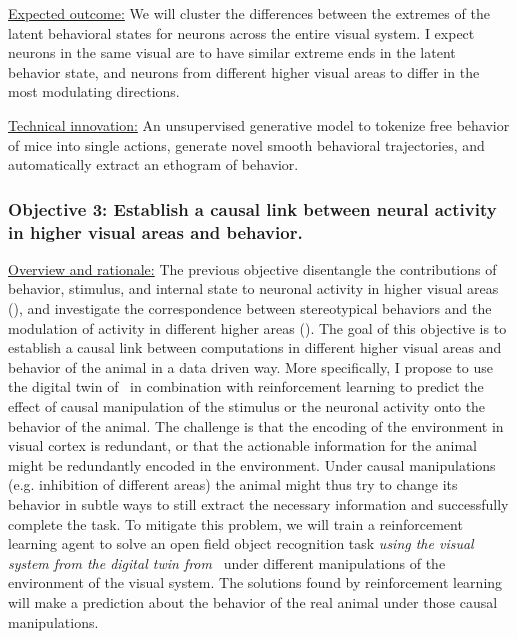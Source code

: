 \documentclass[COG,11pt]{ercgrant}
\begin{document}
\underline{Expected outcome:} 
We will cluster the differences between the extremes of the latent behavioral states for neurons across the entire visual system.
I expect neurons in the same visual are to have similar extreme ends in the latent behavior state, and neurons from different higher visual areas to differ in the most modulating directions. 

\underline{Technical innovation:} 
An unsupervised generative model to tokenize free behavior of mice into single actions, generate novel smooth behavioral trajectories, and automatically extract an ethogram of behavior.

\subsubsection{\colorbox{objiii}{\color{white}Objective 3}: Establish a causal link between neural activity in higher visual areas and behavior.}
\label{sub:objiii}
\underline{Overview and rationale:} 
The previous objective disentangle the contributions of behavior, stimulus, and internal state to neuronal activity in higher visual areas (\obji), and investigate the correspondence between stereotypical behaviors and the modulation of activity in different higher areas (\objii). 
The goal of this objective is to establish a causal link between computations in different higher visual areas and behavior of the animal in a data driven way. 
More specifically, I propose to use the digital twin of \obji~in combination with reinforcement learning to predict the effect of causal manipulation of the stimulus or the neuronal activity onto the behavior of the animal. 
The challenge is that the encoding of the environment in visual cortex is redundant, or that the actionable information for the animal might be redundantly encoded in the environment. 
Under causal manipulations (e.g. inhibition of different areas) the animal might thus try to change its behavior in subtle ways to still extract the necessary information and successfully complete the task.
To mitigate this problem, we will train a reinforcement learning agent to solve an open field object recognition task \textit{using the visual system from the digital twin from \obji}~under different manipulations of the environment of the visual system. 
The solutions found by reinforcement learning will make a prediction about the behavior of the real animal under those causal manipulations. 
\end{document}
